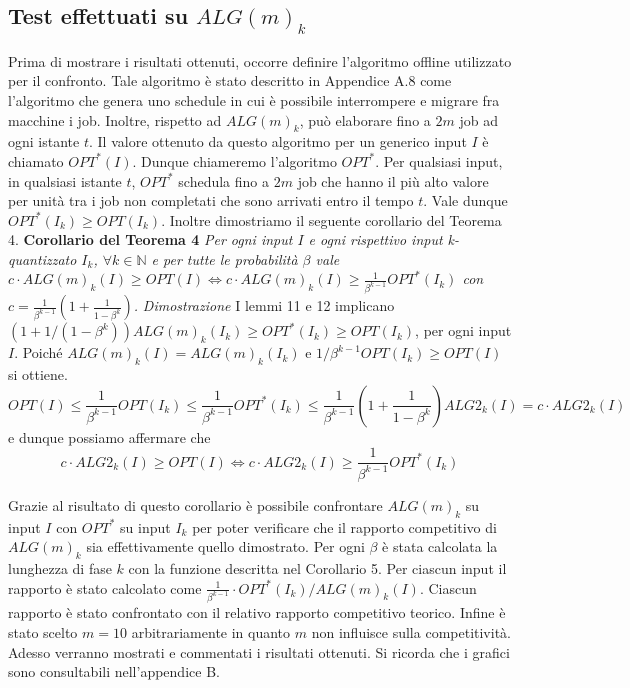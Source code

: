\documentclass[12pt]{article}
\newcommand*{\N}{\mathbb{N}}
\begin{document}
\subsection{Test effettuati su $ALG(m)_{k}$}
Prima di mostrare i risultati ottenuti, occorre definire l’algoritmo offline utilizzato per il confronto. Tale algoritmo è stato descritto in Appendice A.8 come l’algoritmo che genera uno schedule in cui è possibile interrompere e migrare fra macchine i job. Inoltre, rispetto ad $ALG(m)_{k}$, può elaborare fino a $2m$ job ad ogni istante $t$. Il valore ottenuto da questo algoritmo  per un generico input $I$ è chiamato $OPT^{*}(I)$. Dunque chiameremo l'algoritmo $OPT^{*}$. Per qualsiasi input, in qualsiasi istante $t$, $OPT^{*}$ schedula fino a $2m$ job che hanno il più alto valore per unità tra i job non completati che sono arrivati entro il tempo $t$. Vale dunque $OPT^{*}(I_{k}) \geq OPT(I_{k})$. Inoltre dimostriamo il seguente corollario del Teorema 4.
\newline \newline
\textbf{Corollario del Teorema 4}
\textit{Per ogni input $I$ e ogni rispettivo input k-quantizzato $I_{k}$, $\forall k \in \N$ e per tutte le probabilità $\beta$ vale
$c \cdot ALG(m)_{k}(I) \geq OPT(I) \iff c \cdot ALG(m)_{k}(I) \geq \frac{1}{\beta^{k-1}} OPT^{*}(I_{k})$ con $c = \frac{1}{\beta^{k - 1} } (1 + \frac{1}{1 - \beta^{k}})$.}
\newline \newline
\textit{Dimostrazione} 
I lemmi 11 e 12 implicano $(1 + 1 / (1 - \beta^{k}))ALG(m)_{k}(I_{k}) \geq OPT^{*}(I_{k}) \geq OPT (I_{k})$, per ogni input $I$. Poiché $ALG(m)_{k}(I) = ALG(m)_{k}(I_{k})$ e $1 / \beta^{k-1}OPT (I_{k}) \geq OPT (I)$ si ottiene. 
$$OPT(I) \leq \frac{1}{\beta^{k-1}} OPT(I_{k}) \leq \frac{1}{\beta^{k-1}} OPT^{*}(I_{k}) \leq \frac{1}{\beta^{k-1}} (1 + \frac{1}{1 - \beta^{k}}) ALG2_{k}(I) = c \cdot ALG2_{k}(I)$$
e dunque possiamo affermare che
\begin{equation}
c \cdot ALG2_{k}(I) \geq OPT(I) \iff c \cdot ALG2_{k}(I) \geq \frac{1}{\beta^{k-1}} OPT^{*}(I_{k}) \tag*{$\square$}
\end{equation}

Grazie al risultato di questo corollario è possibile confrontare $ALG(m)_{k}$ su input $I$ con $OPT^{*}$ su input $I_{k}$ per poter verificare che il rapporto competitivo di $ALG(m)_{k}$ sia effettivamente quello dimostrato. Per ogni $\beta$ è stata calcolata la lunghezza di fase $k$ con la funzione descritta nel Corollario 5. Per ciascun input il rapporto è stato calcolato come $\frac{1}{\beta^{k-1}} \cdot OPT^{*}(I_{k}) / ALG(m)_{k}(I)$. Ciascun rapporto è stato confrontato con il relativo rapporto competitivo teorico. Infine è stato scelto $m=10$ arbitrariamente in quanto $m$ non influisce sulla competitività. Adesso verranno mostrati e commentati i risultati ottenuti. Si ricorda che i grafici sono consultabili nell'appendice B.
\end{document}
